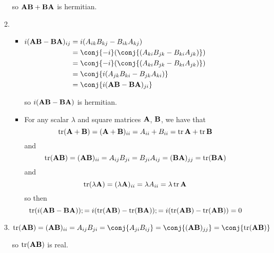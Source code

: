 \documentclass[fleqn,a4paper,11pt]{article}
\begin{document}
\begin{enumerate}[label=\textbf{\arabic*.}]
\begin{enumerate}[label=(\roman*)]
     so \(\mathbf{A}\mathbf{B} + \mathbf{B}\mathbf{A}\) is hermitian.
    \item
     \begin{itemize}
      \item \(
       \begin{aligned}[t]
        i(\mat A\mat B - \mat B\mat A)_{ij}
         &= i( A_{ik}  B_{kj} -  B_{ik}  A_{kj}) \\
         &= \conj{-i}(\conj{( A_{ki}  B_{jk}
           -  B_{ki}  A_{jk})}) \\
         &= \conj{-i}(\conj{( A_{ki}  B_{jk}
           -  B_{ki}  A_{jk})}) \\
         &= \conj{i( A_{jk}  B_{ki} -  B_{jk}  A_{ki})} \\
         &= \conj{i(\mat A\mat B - \mat B\mat A)_{ji}}
       \end{aligned}\)

       so \(i(\mathbf{A}\mathbf{B} - \mathbf{B}\mathbf{A})\) is hermitian.
      \item
       For any scalar \(\lambda\) and square matrices \(\mathbf{A}\), \(\mathbf{B}\), we
       have that
       \begin{equation*}
        \operatorname{tr}(\mathbf{A} + \mathbf{B})
         = (\mathbf{A} + \mathbf{B})_{ii}
         =  A_{ii} +  B_{ii}
         = \operatorname{tr}\mathbf{A} + \operatorname{tr}\mathbf{B}
       \end{equation*}
       and
       \begin{equation*}
        \operatorname{tr}(\mathbf{A}\mathbf{B})
        = (\mathbf{A}\mathbf{B})_{ii}
        =  A_{ij}  B_{ji}
        =  B_{ji}  A_{ij}
        = (\mathbf{B}\mathbf{A})_{jj}
         = \operatorname{tr}(\mathbf{B}\mathbf{A})
       \end{equation*}
       and
       \begin{equation*}
        \operatorname{tr}(\lambda \mathbf{A})
        = (\lambda \mathbf{A})_{ii}
        = \lambda  A_{ii}
        = \lambda \operatorname{tr}\mathbf{A}
       \end{equation*}
       so then
       \begin{equation*}
        \operatorname{tr}(i(\mathbf{A}\mathbf{B} - \mathbf{B}\mathbf{A}));
        = i(\operatorname{tr}(\mathbf{A}\mathbf{B}) - \operatorname{tr}(\mathbf{B}\mathbf{A}));
        = i(\operatorname{tr}(\mathbf{A}\mathbf{B}) - \operatorname{tr}(\mathbf{A}\mathbf{B})) = 0
       \end{equation*}
     \end{itemize}
    \item \(
      \tr(\mat A\mat B)
      = (\mat A\mat B)_{ii}
      =  A_{ij}  B_{ji}
      = \conj{ A_{ji}  B_{ij}}
      = \conj{(\mat A\mat B)_{jj}} = \conj{\tr(\mat A\mat B)}
      \)

      so \(\operatorname{tr}(\mathbf{A}\mathbf{B})\) is real.


\end{enumerate}
\end{enumerate}
\end{document}

